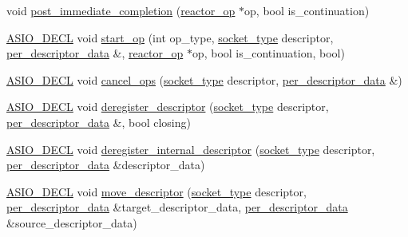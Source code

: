 \begin{DoxyCompactItemize}
\item 
void \hyperlink{classasio_1_1detail_1_1select__reactor_a01786d5d73b69942001c68a555a97fe2}{post\+\_\+immediate\+\_\+completion} (\hyperlink{classasio_1_1detail_1_1reactor__op}{reactor\+\_\+op} $\ast$op, bool is\+\_\+continuation)
\item 
\hyperlink{config_8hpp_ab54d01ea04afeb9a8b39cfac467656b7}{A\+S\+I\+O\+\_\+\+D\+E\+C\+L} void \hyperlink{classasio_1_1detail_1_1select__reactor_a7279e720c8228f7935885a4b2e5d3e1d}{start\+\_\+op} (int op\+\_\+type, \hyperlink{namespaceasio_1_1detail_a6798c771dd84b79798b1a08150706ea9}{socket\+\_\+type} descriptor, \hyperlink{structasio_1_1detail_1_1select__reactor_1_1per__descriptor__data}{per\+\_\+descriptor\+\_\+data} \&, \hyperlink{classasio_1_1detail_1_1reactor__op}{reactor\+\_\+op} $\ast$op, bool is\+\_\+continuation, bool)
\item 
\hyperlink{config_8hpp_ab54d01ea04afeb9a8b39cfac467656b7}{A\+S\+I\+O\+\_\+\+D\+E\+C\+L} void \hyperlink{classasio_1_1detail_1_1select__reactor_a573be73d54e15b9cbc419ba0eb2c904d}{cancel\+\_\+ops} (\hyperlink{namespaceasio_1_1detail_a6798c771dd84b79798b1a08150706ea9}{socket\+\_\+type} descriptor, \hyperlink{structasio_1_1detail_1_1select__reactor_1_1per__descriptor__data}{per\+\_\+descriptor\+\_\+data} \&)
\item 
\hyperlink{config_8hpp_ab54d01ea04afeb9a8b39cfac467656b7}{A\+S\+I\+O\+\_\+\+D\+E\+C\+L} void \hyperlink{classasio_1_1detail_1_1select__reactor_a548e7a62f94c21de50020bbf05f71fd2}{deregister\+\_\+descriptor} (\hyperlink{namespaceasio_1_1detail_a6798c771dd84b79798b1a08150706ea9}{socket\+\_\+type} descriptor, \hyperlink{structasio_1_1detail_1_1select__reactor_1_1per__descriptor__data}{per\+\_\+descriptor\+\_\+data} \&, bool closing)
\item 
\hyperlink{config_8hpp_ab54d01ea04afeb9a8b39cfac467656b7}{A\+S\+I\+O\+\_\+\+D\+E\+C\+L} void \hyperlink{classasio_1_1detail_1_1select__reactor_abb284994b52f89d88fdcb739557635ec}{deregister\+\_\+internal\+\_\+descriptor} (\hyperlink{namespaceasio_1_1detail_a6798c771dd84b79798b1a08150706ea9}{socket\+\_\+type} descriptor, \hyperlink{structasio_1_1detail_1_1select__reactor_1_1per__descriptor__data}{per\+\_\+descriptor\+\_\+data} \&descriptor\+\_\+data)
\item 
\hyperlink{config_8hpp_ab54d01ea04afeb9a8b39cfac467656b7}{A\+S\+I\+O\+\_\+\+D\+E\+C\+L} void \hyperlink{classasio_1_1detail_1_1select__reactor_a2c234d7bc286c431e556a6031b300384}{move\+\_\+descriptor} (\hyperlink{namespaceasio_1_1detail_a6798c771dd84b79798b1a08150706ea9}{socket\+\_\+type} descriptor, \hyperlink{structasio_1_1detail_1_1select__reactor_1_1per__descriptor__data}{per\+\_\+descriptor\+\_\+data} \&target\+\_\+descriptor\+\_\+data, \hyperlink{structasio_1_1detail_1_1select__reactor_1_1per__descriptor__data}{per\+\_\+descriptor\+\_\+data} \&source\+\_\+descriptor\+\_\+data)

\end{DoxyCompactItemize}
